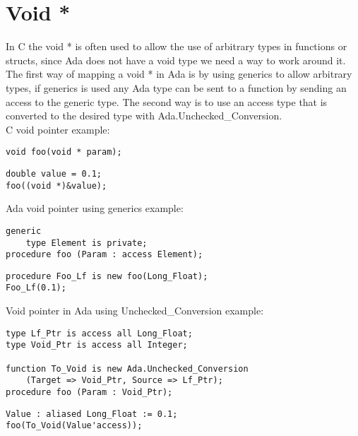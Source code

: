 \section{Void *}\label{sec:voidstar}
In C the void * is often used to allow the use of arbitrary types in functions or structs, since Ada does not have a void type we need a way to work around it.
The first way of mapping a void * in Ada is by using generics to allow arbitrary types, if generics is used any Ada type can be sent to a function by sending an access to the generic type. The second way is to use an access type that is converted to the desired type with Ada.Unchecked_Conversion.
\\
C void pointer example:
\begin{lstlisting}
void foo(void * param);
\end{lstlisting}
\begin{lstlisting}
double value = 0.1;
foo((void *)&value);
\end{lstlisting}
Ada void pointer using generics example:
\begin{lstlisting}
generic
	type Element is private;
procedure foo (Param : access Element);
\end{lstlisting}
\begin{lstlisting}
procedure Foo_Lf is new foo(Long_Float);
Foo_Lf(0.1);
\end{lstlisting}
Void pointer in Ada using Unchecked_Conversion example:
\begin{lstlisting}
type Lf_Ptr is access all Long_Float;
type Void_Ptr is access all Integer;

function To_Void is new Ada.Unchecked_Conversion
	(Target => Void_Ptr, Source => Lf_Ptr);
procedure foo (Param : Void_Ptr);
\end{lstlisting}
\begin{lstlisting}
Value : aliased Long_Float := 0.1;
foo(To_Void(Value'access));
\end{lstlisting}
